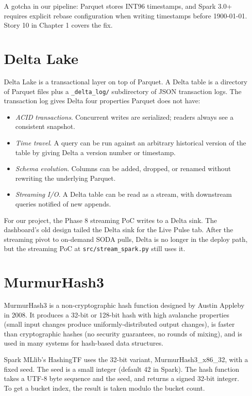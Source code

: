 \documentclass[11pt,letterpaper]{book}
\begin{document}
A gotcha in our pipeline: Parquet stores INT96 timestamps, and Spark 3.0+ requires explicit rebase configuration when writing timestamps before 1900-01-01. Story 10 in Chapter 1 covers the fix.

\section{Delta Lake}

Delta Lake is a transactional layer on top of Parquet. A Delta table is a directory of Parquet files plus a \texttt{\_delta\_log/} subdirectory of JSON transaction logs. The transaction log gives Delta four properties Parquet does not have:

\begin{itemize}
\item \emph{ACID transactions}. Concurrent writes are serialized; readers always see a consistent snapshot.
\item \emph{Time travel}. A query can be run against an arbitrary historical version of the table by giving Delta a version number or timestamp.
\item \emph{Schema evolution}. Columns can be added, dropped, or renamed without rewriting the underlying Parquet.
\item \emph{Streaming I/O}. A Delta table can be read as a stream, with downstream queries notified of new appends.
\end{itemize}

For our project, the Phase 8 streaming PoC writes to a Delta sink. The dashboard's old design tailed the Delta sink for the Live Pulse tab. After the streaming pivot to on-demand SODA pulls, Delta is no longer in the deploy path, but the streaming PoC at \texttt{src/stream\_spark.py} still uses it.

\section{MurmurHash3}
\label{sec:foundations-mmh3}

MurmurHash3 \cite{austin2008mmh3} is a non-cryptographic hash function designed by Austin Appleby in 2008. It produces a 32-bit or 128-bit hash with high avalanche properties (small input changes produce uniformly-distributed output changes), is faster than cryptographic hashes (no security guarantees, no rounds of mixing), and is used in many systems for hash-based data structures.

Spark MLlib's HashingTF uses the 32-bit variant, MurmurHash3\_x86\_32, with a fixed seed. The seed is a small integer (default 42 in Spark). The hash function takes a UTF-8 byte sequence and the seed, and returns a signed 32-bit integer. To get a bucket index, the result is taken modulo the bucket count.
\end{document}
